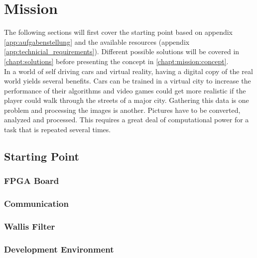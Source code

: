 %
%
\chapter{Mission} \label{chapt:mission}
The following sections will
first cover the starting point based on appendix \ref{app:aufgabenstellung} and the available resources (appendix \ref{app:technicial_requirements}). Different possible
solutions will be covered in \ref{chapt:solutions} before presenting the concept
in \ref{chapt:mission:concept}.
\\

In a world of self driving cars and virtual reality, having a digital copy of
the real world yields several benefits. Cars can be trained in a virtual city
to increase the performance of their algorithms and video games could get more
realistic if the player could walk through the streets of a major city. Gathering
this data is one problem and processing the images is another. Pictures have
to be converted, analyzed and processed. This requires a great deal of
computational power for a task that is repeated several times.

%
%
\section{Starting Point}

\subsection{FPGA Board} \label{chapt:mission:fpgaboard}

\subsection{Communication} \label{chapt:mission:communication}

\subsection{Wallis Filter} \label{chapt:mission:wallis}

\subsection{Development Environment}

